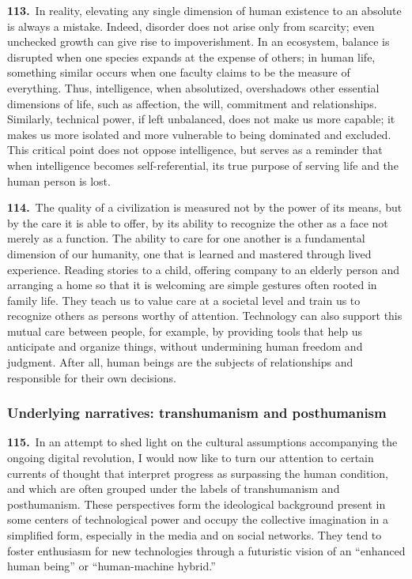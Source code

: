 \documentclass{article}
\begin{document}
\textbf{113.}\ In reality, elevating any single dimension of human existence to an absolute is always a mistake. Indeed, disorder does not arise only from scarcity; even unchecked growth can give rise to impoverishment. In an ecosystem, balance is disrupted when one species expands at the expense of others; in human life, something similar occurs when one faculty claims to be the measure of everything. Thus, intelligence, when absolutized, overshadows other essential dimensions of life, such as affection, the will, commitment and relationships. Similarly, technical power, if left unbalanced, does not make us more capable; it makes us more isolated and more vulnerable to being dominated and excluded. This critical point does not oppose intelligence, but serves as a reminder that when intelligence becomes self-referential, its true purpose of serving life and the human person is lost.

\textbf{114.}\ The quality of a civilization is measured not by the power of its means, but by the care it is able to offer, by its ability to recognize the other as a face not merely as a function. The ability to care for one another is a fundamental dimension of our humanity, one that is learned and mastered through lived experience. Reading stories to a child, offering company to an elderly person and arranging a home so that it is welcoming are simple gestures often rooted in family life. They teach us to value care at a societal level and train us to recognize others as persons worthy of attention. Technology can also support this mutual care between people, for example, by providing tools that help us anticipate and organize things, without undermining human freedom and judgment. After all, human beings are the subjects of relationships and responsible for their own decisions.

\subsubsection{Underlying narratives: transhumanism and posthumanism}

\textbf{115.}\ In an attempt to shed light on the cultural assumptions accompanying the ongoing digital revolution, I would now like to turn our attention to certain currents of thought that interpret progress as surpassing the human condition, and which are often grouped under the labels of transhumanism and posthumanism. These perspectives form the ideological background present in some centers of technological power and occupy the collective imagination in a simplified form, especially in the media and on social networks. They tend to foster enthusiasm for new technologies through a futuristic vision of an ``enhanced human being'' or ``human-machine hybrid.''
\end{document}
